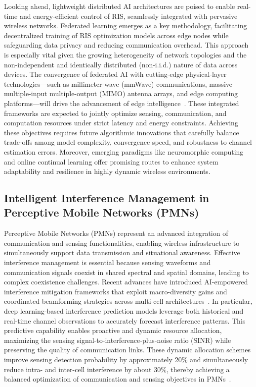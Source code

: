 \documentclass[sigconf]{acmart}
\begin{document}
Looking ahead, lightweight distributed AI architectures are poised to enable real-time and energy-efficient control of RIS, seamlessly integrated with pervasive wireless networks. Federated learning emerges as a key methodology, facilitating decentralized training of RIS optimization models across edge nodes while safeguarding data privacy and reducing communication overhead. This approach is especially vital given the growing heterogeneity of network topologies and the non-independent and identically distributed (non-i.i.d.) nature of data across devices. The convergence of federated AI with cutting-edge physical-layer technologies—such as millimeter-wave (mmWave) communications, massive multiple-input multiple-output (MIMO) antenna arrays, and edge computing platforms—will drive the advancement of edge intelligence~\cite{ref49}. These integrated frameworks are expected to jointly optimize sensing, communication, and computation resources under strict latency and energy constraints. Achieving these objectives requires future algorithmic innovations that carefully balance trade-offs among model complexity, convergence speed, and robustness to channel estimation errors. Moreover, emerging paradigms like neuromorphic computing and online continual learning offer promising routes to enhance system adaptability and resilience in highly dynamic wireless environments.

\subsection{Intelligent Interference Management in Perceptive Mobile Networks (PMNs)}

Perceptive Mobile Networks (PMNs) represent an advanced integration of communication and sensing functionalities, enabling wireless infrastructure to simultaneously support data transmission and situational awareness. Effective interference management is essential because sensing waveforms and communication signals coexist in shared spectral and spatial domains, leading to complex coexistence challenges. Recent advances have introduced AI-empowered interference mitigation frameworks that exploit macro-diversity gains and coordinated beamforming strategies across multi-cell architectures~\cite{ref48}. In particular, deep learning-based interference prediction models leverage both historical and real-time channel observations to accurately forecast interference patterns. This predictive capability enables proactive and dynamic resource allocation, maximizing the sensing signal-to-interference-plus-noise ratio (SINR) while preserving the quality of communication links. These dynamic allocation schemes improve sensing detection probability by approximately 20\% and simultaneously reduce intra- and inter-cell interference by about 30\%, thereby achieving a balanced optimization of communication and sensing objectives in PMNs~\cite{ref48}.
\end{document}
